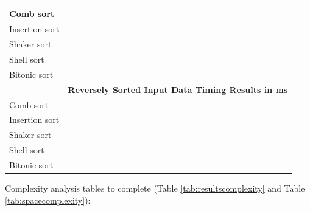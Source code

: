 \documentclass[11pt]{article}
\begin{document}
\begin{table}[ht!]
{\begin{tabular}{|l|l|l|l|l|l|l|l|l|l|l|}
Comb sort                                 &     &      &      &      &      &       &       &       &        &        \\ \hline
Insertion sort                                     &     &      &      &      &      &       &       &       &        &        \\ \hline
Shaker sort                                    &     &      &      &      &      &       &       &       &        &        \\ \hline
Shell sort                                     &     &      &      &      &      &       &       &       &        &        \\ \hline
Bitonic sort                                    &     &      &      &      &      &       &       &       &        &        \\ \hline
                                               & \multicolumn{10}{c|}{\textbf{Reversely Sorted Input Data Timing Results in ms}}                          \\ \hline
Comb sort                                 &     &      &      &      &      &       &       &       &        &        \\ \hline
Insertion sort                                     &     &      &      &      &      &       &       &       &        &        \\ \hline
Shaker sort                                    &     &      &      &      &      &       &       &       &        &       \\ \hline
Shell sort                                     &     &      &      &      &      &       &       &       &        &        \\ \hline
Bitonic sort                                    &     &      &      &      &      &       &       &       &        &        \\ \hline
\end{tabular}
}
\end{table}

Complexity analysis tables to complete (Table \ref{tab:resultscomplexity} and Table \ref{tab:spacecomplexity}):
\end{document}
